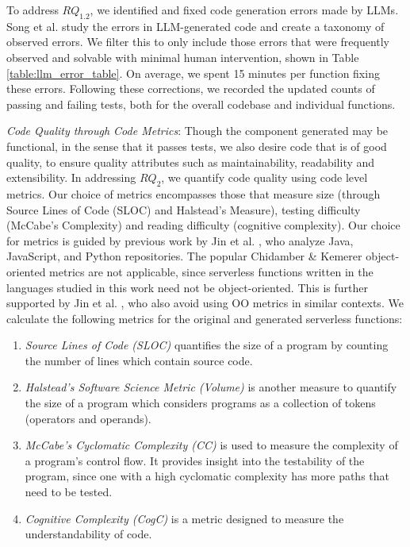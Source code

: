 To address $RQ_{1.2}$, we identified and fixed code generation errors made by LLMs. Song et al.\cite{song2023empirical} study the errors in LLM-generated code and create a taxonomy of observed errors. We filter this to only include those errors that were frequently observed and solvable with minimal human intervention, shown in Table \ref{table:llm_error_table}.
On average, we spent 15 minutes per function fixing these errors. Following these corrections, we recorded the updated counts of passing and failing tests, both for the overall codebase and individual functions.




\textit{Code Quality through Code Metrics}: Though the component generated may be functional, in the sense that it passes tests, we also desire code that is of good quality, to ensure quality attributes such as maintainability, readability and extensibility. In addressing $RQ_{2}$, we quantify code quality using code level metrics.
Our choice of metrics encompasses those that measure size (through Source Lines of Code (SLOC) and Halstead's Measure), testing difficulty (McCabe's Complexity) and reading difficulty (cognitive complexity). 
Our choice for metrics is guided by previous work by Jin et al. \cite{jin_metrics}, who analyze Java, JavaScript, and Python repositories. The popular Chidamber \& Kemerer object-oriented metrics \cite{chidamber1994metrics} are not applicable, since serverless functions written in the languages studied in this work need not be object-oriented. This is further supported by Jin et al. \cite{jin_metrics}, who also avoid using OO metrics in similar contexts. We calculate the following metrics for the original and generated serverless functions: 
\begin{enumerate}
    \item \textit{Source Lines of Code (SLOC)} quantifies the size of a program by counting the number of lines which contain source code.
    \item \textit{Halstead's Software Science Metric (Volume)} \cite{halstead_measure} is another measure to quantify the size of a program which considers programs as a collection of tokens (operators and operands).
    \item \textit{McCabe's Cyclomatic Complexity (CC)} \cite{mccabe1976complexity} is used to measure the complexity of a program's control flow. It provides insight into the testability of the program, since one with a high cyclomatic complexity has more paths that need to be tested.
    \item \textit{Cognitive Complexity (CogC)} \cite{campbell2018cognitivecomplexity} is a metric designed to measure the understandability of code.
\end{enumerate}

